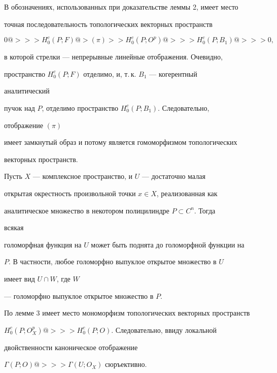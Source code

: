  


\begin{pf} 


В обозначениях, использованных при доказательстве леммы 2, имеет место 


точная последовательность топологических векторных пространств 


$$ 


0@>>>H^c_0(P;F)@>{(\pi)}>>H^c_0(P;O^p)@>>>H^c_0(P;B_1)@>>>0, 


$$ 


в которой стрелки --- непрерывные линейные отображения. Очевидно,


пространство $H^c_0(P;F)$ отделимо, и, т.\,к.{} $B_1$ --- когерентный 


аналитический 


пучок над $P$, отделимо пространство $H^c_0(P;B_1)$. Следовательно, 


отображение $(\pi)$ 


имеет замкнутый образ и потому является гомоморфизмом топологических 


векторных пространств. 


\end{pf} 


 


\begin{lem} 


Пусть $X$ --- комплексное пространство, и $U$ --- достаточно малая 


открытая окрестность произвольной точки $x\in X$, реализованная как 


аналитическое множество в некотором полицилиндре $P\subset C^n$. Тогда 


всякая 


голоморфная функция на $U$ может быть поднята до голоморфной функции на 


$P$. В частности, любое голоморфно выпуклое открытое множество в $U$ 


имеет вид $U\cap W$, где $W$ 


--- голоморфно выпуклое открытое множество в $P$. 


\end{lem} 


 


\begin{pf} 


По лемме 3 имеет место мономорфизм топологических векторных пространств 


$H^c_0(P;O^p_X)@>>>H^c_0(P;O)$. Следовательно, ввиду локальной 


двойственности каноническое отображение 


$\Gamma(P;O)@>>>\Gamma(U;O_X)$ сюръективно. 


\end{pf} 



